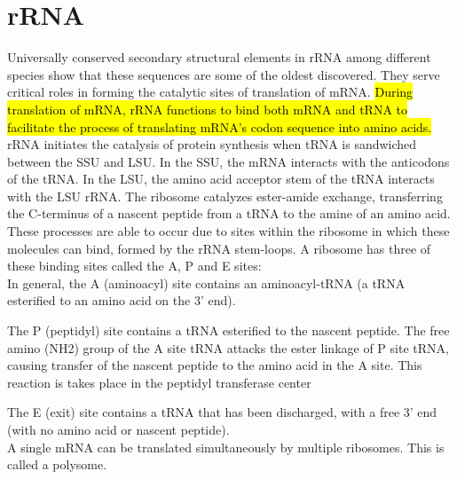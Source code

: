 \newpage
\section*{rRNA}
Universally conserved secondary structural elements in rRNA among different species show that these sequences are some of the oldest discovered. They serve critical roles in forming the catalytic sites of translation of mRNA. \hl{During translation of mRNA, rRNA functions to bind both mRNA and tRNA to facilitate the process of translating mRNA's codon sequence into amino acids.} rRNA initiates the catalysis of protein synthesis when tRNA is sandwiched between the SSU and LSU. In the SSU, the mRNA interacts with the anticodons of the tRNA. In the LSU, the amino acid acceptor stem of the tRNA interacts with the LSU rRNA. The ribosome catalyzes ester-amide exchange, transferring the C-terminus of a nascent peptide from a tRNA to the amine of an amino acid. These processes are able to occur due to sites within the ribosome in which these molecules can bind, formed by the rRNA stem-loops. A ribosome has three of these binding sites called the A, P and E sites:
\\

\textbullet \space In general, the A (aminoacyl) site contains an aminoacyl-tRNA (a tRNA esterified to an amino acid on the 3' end).

\textbullet \space The P (peptidyl) site contains a tRNA esterified to the nascent peptide. The free amino (NH2) group of the A site tRNA attacks the ester linkage of P site tRNA, causing transfer of the nascent peptide to the amino acid in the A site. This reaction is takes place in the peptidyl transferase center

\textbullet \space The E (exit) site contains a tRNA that has been discharged, with a free 3' end (with no amino acid or nascent peptide).
\\

A single mRNA can be translated simultaneously by multiple ribosomes. This is called a polysome.

